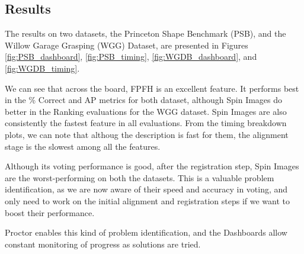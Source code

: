 \subsection{Results}
The results on two datasets, the Princeton Shape Benchmark (PSB), and the Willow Garage Grasping (WGG) Dataset, are presented in Figures \ref{fig:PSB_dashboard}, \ref{fig:PSB_timing}, \ref{fig:WGDB_dashboard}, and \ref{fig:WGDB_timing}.

We can see that across the board, FPFH is an excellent feature.
It performs best in the \% Correct and AP metrics for both dataset, although Spin Images do better in the Ranking evaluations for the WGG dataset.
Spin Images are also consistently the fastest feature in all evaluations.
From the timing breakdown plots, we can note that althoug the description is fast for them, the alignment stage is the slowest among all the features.

Although its voting performance is good, after the registration step, Spin Images are the worst-performing on both the datasets.
This is a valuable problem identification, as we are now aware of their speed and accuracy in voting, and only need to work on the initial alignment and registration steps if we want to boost their performance.

Proctor enables this kind of problem identification, and the Dashboards allow constant monitoring of progress as solutions are tried.
